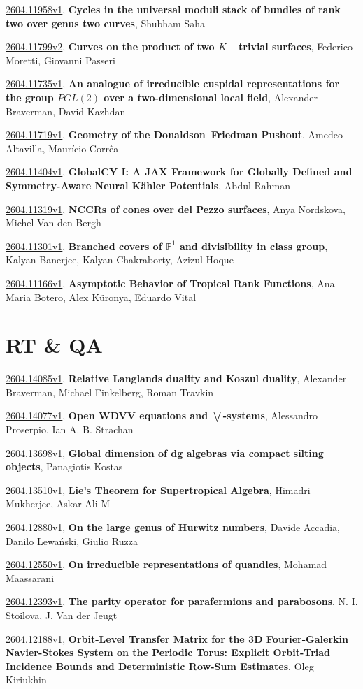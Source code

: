 \documentclass[9pt, a4paper]{article}
\theoremstyle{plain}
\theoremstyle{definition}
\theoremstyle{remark}
\newcommand{\arxiv}[3]{\href{https://arxiv.org/abs/#1}{#1}, \textbf{\textcolor{arxivblue}{#2}}, #3}
\begin{document}
\arxiv{2604.11958v1}{Cycles in the universal moduli stack of bundles of rank two over genus two curves}{Shubham Saha}

\arxiv{2604.11799v2}{Curves on the product of two $K-$trivial surfaces}{Federico Moretti, Giovanni Passeri}

\arxiv{2604.11735v1}{An analogue of irreducible cuspidal representations for the group $PGL(2)$ over a two-dimensional local field}{Alexander Braverman, David Kazhdan}

\arxiv{2604.11719v1}{Geometry of the Donaldson--Friedman Pushout}{Amedeo Altavilla, Maurício Corrêa}

\arxiv{2604.11404v1}{GlobalCY I: A JAX Framework for Globally Defined and Symmetry-Aware Neural Kähler Potentials}{Abdul Rahman}

\arxiv{2604.11319v1}{NCCRs of cones over del Pezzo surfaces}{Anya Nordskova, Michel Van den Bergh}

\arxiv{2604.11301v1}{Branched covers of $\mathbb{P}^1$ and divisibility in class group}{Kalyan Banerjee, Kalyan Chakraborty, Azizul Hoque}

\arxiv{2604.11166v1}{Asymptotic Behavior of Tropical Rank Functions}{Ana Maria Botero, Alex Küronya, Eduardo Vital}


\section{RT \& QA}
\arxiv{2604.14085v1}{Relative Langlands duality and Koszul duality}{Alexander Braverman, Michael Finkelberg, Roman Travkin}

\arxiv{2604.14077v1}{Open WDVV equations and $\bigvee$-systems}{Alessandro Proserpio, Ian A. B. Strachan}

\arxiv{2604.13698v1}{Global dimension of dg algebras via compact silting objects}{Panagiotis Kostas}

\arxiv{2604.13510v1}{Lie's Theorem for Supertropical Algebra}{Himadri Mukherjee, Askar Ali M}

\arxiv{2604.12880v1}{On the large genus of Hurwitz numbers}{Davide Accadia, Danilo Lewański, Giulio Ruzza}

\arxiv{2604.12550v1}{On irreducible representations of quandles}{Mohamad Maassarani}

\arxiv{2604.12393v1}{The parity operator for parafermions and parabosons}{N. I. Stoilova, J. Van der Jeugt}

\arxiv{2604.12188v1}{Orbit-Level Transfer Matrix for the 3D Fourier-Galerkin Navier-Stokes System on the Periodic Torus: Explicit Orbit-Triad Incidence Bounds and Deterministic Row-Sum Estimates}{Oleg Kiriukhin}
\end{document}
